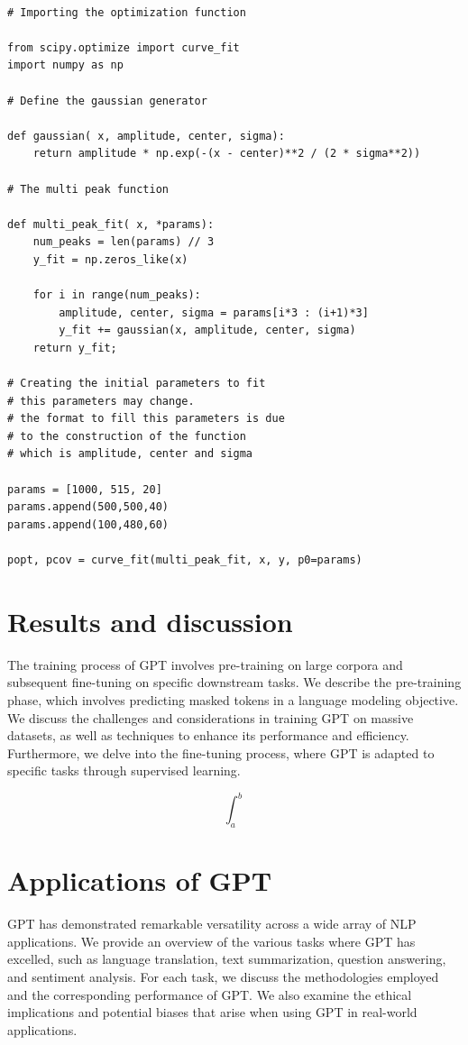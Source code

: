 \documentclass[a4paper,10pt,twocolumn]{article}
\begin{document}
\begin{lstlisting}[basicstyle=\fontsize{5}{4}\selectfont\ttfamily]

# Importing the optimization function

from scipy.optimize import curve_fit
import numpy as np

# Define the gaussian generator

def gaussian( x, amplitude, center, sigma):
    return amplitude * np.exp(-(x - center)**2 / (2 * sigma**2))

# The multi peak function

def multi_peak_fit( x, *params):
    num_peaks = len(params) // 3
    y_fit = np.zeros_like(x)

    for i in range(num_peaks):
        amplitude, center, sigma = params[i*3 : (i+1)*3]
        y_fit += gaussian(x, amplitude, center, sigma)
    return y_fit;

# Creating the initial parameters to fit
# this parameters may change.
# the format to fill this parameters is due
# to the construction of the function
# which is amplitude, center and sigma

params = [1000, 515, 20]
params.append(500,500,40)
params.append(100,480,60)

popt, pcov = curve_fit(multi_peak_fit, x, y, p0=params)

\end{lstlisting}

\section{Results and discussion}
The training process of GPT involves pre-training on large corpora and subsequent fine-tuning on specific downstream tasks. We describe the pre-training phase, which involves predicting masked tokens in a language modeling objective. We discuss the challenges and considerations in training GPT on massive datasets, as well as techniques to enhance its performance and efficiency. Furthermore, we delve into the fine-tuning process, where GPT is adapted to specific tasks through supervised learning.

    \begin{equation}
    \int_{a}^{b}
    \end{equation}

\section{Applications of GPT}
GPT has demonstrated remarkable versatility across a wide array of NLP applications. We provide an overview of the various tasks where GPT has excelled, such as language translation, text summarization, question answering, and sentiment analysis. For each task, we discuss the methodologies employed and the corresponding performance of GPT. We also examine the ethical implications and potential biases that arise when using GPT in real-world applications.
\end{document}
